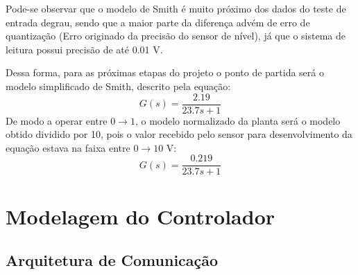 \documentclass[
	article,			%
	11pt,				%
	oneside,			%
	a4paper,			%
	section=TITLE,		%
	english,			%
	brazil,				%
	sumario=tradicional
	]{abntex2}
\begin{document}
Pode-se observar que o modelo de Smith é muito próximo dos dados do teste de entrada degrau, sendo que a maior parte da diferença advém de erro de quantização (Erro originado da precisão do sensor de nível), já que o sistema de leitura possui precisão de até 0.01 V.

Dessa forma, para as próximas etapas do projeto o ponto de partida será o modelo simplificado de Smith, descrito pela equação: 
\begin{equation}
     G(s) = \frac{2.19}{23.7 s + 1}
     \label{eq:planta}
\end{equation}
De modo a operar entre $0 \to 1$, o modelo normalizado da planta será o modelo obtido dividido por 10, pois o valor recebido pelo sensor para desenvolvimento da equação estava na faixa entre $0 \to 10$ V:
\begin{equation}
    G(s) = \frac{0.219}{23.7 s + 1}
\end{equation}
 



\section{Modelagem do Controlador}
\subsection{Arquitetura de Comunicação}

    
\end{document}
